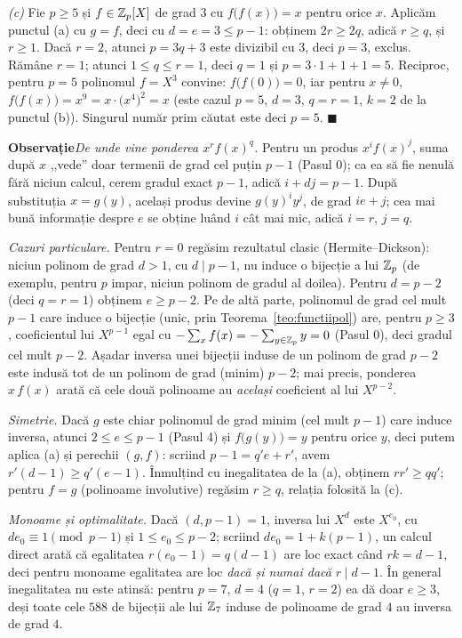 \begin{solutie}
\smallskip
\textit{(c)} Fie $p\ge 5$ și $f\in\mathbb{Z}_p[X]$ de grad $3$ cu $f\bigl(f(x)\bigr)=x$ pentru orice $x$. Aplicăm punctul (a) cu $g=f$, deci cu $d=e=3\le p-1$: obținem $2r\ge 2q$, adică $r\ge q$, și $r\ge 1$. Dacă $r=2$, atunci $p=3q+3$ este divizibil cu $3$, deci $p=3$, exclus. Rămâne $r=1$; atunci $1\le q\le r=1$, deci $q=1$ și $p=3\cdot 1+1+1=5$. Reciproc, pentru $p=5$ polinomul $f=X^{3}$ convine: $f\bigl(f(0)\bigr)=0$, iar pentru $x\neq 0$, $f\bigl(f(x)\bigr)=x^{9}=x\cdot\bigl(x^{4}\bigr)^{2}=x$ (este cazul $p=5$, $d=3$, $q=r=1$, $k=2$ de la punctul (b)). Singurul număr prim căutat este deci $p=5$. $\blacksquare$

\medskip
\noindent\textbf{Observație}\quad \emph{De unde vine ponderea $x^{r}f(x)^{q}$.} Pentru un produs $x^{i}f(x)^{j}$, suma după $x$ ,,vede'' doar termenii de grad cel puțin $p-1$ (Pasul 0); ca ea să fie nenulă fără niciun calcul, cerem gradul exact $p-1$, adică $i+dj=p-1$. După substituția $x=g(y)$, același produs devine $g(y)^{i}y^{j}$, de grad $ie+j$; cea mai bună informație despre $e$ se obține luând $i$ cât mai mic, adică $i=r$, $j=q$.

\emph{Cazuri particulare.} Pentru $r=0$ regăsim rezultatul clasic (Hermite--Dickson): niciun polinom de grad $d>1$, cu $d\mid p-1$, nu induce o bijecție a lui $\mathbb{Z}_p$ (de exemplu, pentru $p$ impar, niciun polinom de gradul al doilea). Pentru $d=p-2$ (deci $q=r=1$) obținem $e\ge p-2$. Pe de altă parte, polinomul de grad cel mult $p-1$ care induce o bijecție (unic, prin Teorema~\ref{teo:functiipol}) are, pentru $p\ge 3$, coeficientul lui $X^{p-1}$ egal cu $-\sum_{x}f(x)=-\sum_{y\in\mathbb{Z}_p}y=0$ (Pasul 0), deci gradul cel mult $p-2$. Așadar inversa unei bijecții induse de un polinom de grad $p-2$ este indusă tot de un polinom de grad (minim) $p-2$; mai precis, ponderea $x\,f(x)$ arată că cele două polinoame au \emph{același} coeficient al lui $X^{p-2}$.

\emph{Simetrie.} Dacă $g$ este chiar polinomul de grad minim (cel mult $p-1$) care induce inversa, atunci $2\le e\le p-1$ (Pasul 4) și $f\bigl(g(y)\bigr)=y$ pentru orice $y$, deci putem aplica (a) și perechii $(g,f)$: scriind $p-1=q'e+r'$, avem $r'(d-1)\ge q'(e-1)$. Înmulțind cu inegalitatea de la (a), obținem $rr'\ge qq'$; pentru $f=g$ (polinoame involutive) regăsim $r\ge q$, relația folosită la (c).

\emph{Monoame și optimalitate.} Dacă $(d,p-1)=1$, inversa lui $X^{d}$ este $X^{e_0}$, cu $de_0\equiv 1\pmod{p-1}$ și $1\le e_0\le p-2$; scriind $de_0=1+k(p-1)$, un calcul direct arată că egalitatea $r(e_0-1)=q(d-1)$ are loc exact când $rk=d-1$, deci pentru monoame egalitatea are loc \emph{dacă și numai dacă} $r\mid d-1$. În general inegalitatea nu este atinsă: pentru $p=7$, $d=4$ ($q=1$, $r=2$) ea dă doar $e\ge 3$, deși toate cele $588$ de bijecții ale lui $\mathbb{Z}_7$ induse de polinoame de grad $4$ au inversa de grad $4$.


\end{solutie}
